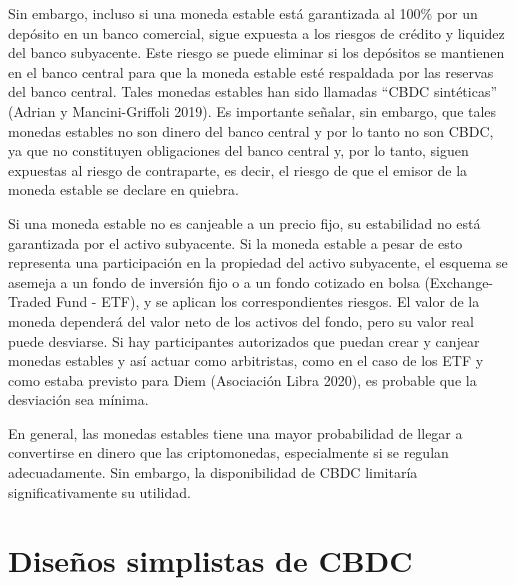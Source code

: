 \documentclass[10pt,spanish]{article}
\begin{document}
Sin embargo, incluso si una moneda estable está garantizada al 100\% por
un depósito en un banco comercial, sigue expuesta a los riesgos de
crédito y liquidez del banco subyacente. Este riesgo se puede eliminar
si los depósitos se mantienen en el banco central para que la moneda
estable esté respaldada por las reservas del banco central. Tales
monedas estables han sido llamadas ``CBDC sintéticas'' (Adrian y
Mancini-Griffoli 2019). Es importante señalar, sin embargo, que tales
monedas estables no son dinero del banco central y por lo tanto no son
CBDC, ya que no constituyen obligaciones del banco central y, por lo
tanto, siguen expuestas al riesgo de contraparte, es decir, el riesgo de
que el emisor de la moneda estable se declare en quiebra.

Si una moneda estable no es canjeable a un precio fijo, su estabilidad
no está garantizada por el activo subyacente. Si la moneda estable a
pesar de esto representa una participación en la propiedad del activo
subyacente, el esquema se asemeja a un fondo de inversión fijo o a un
fondo cotizado en bolsa (Exchange-Traded Fund - ETF), y se aplican los
correspondientes riesgos. El valor de la moneda dependerá del valor neto
de los activos del fondo, pero su valor real puede desviarse. Si hay
participantes autorizados que puedan crear y canjear monedas estables y
así actuar como arbitristas, como en el caso de los ETF y como estaba
previsto para Diem (Asociación Libra 2020), es probable que la
desviación sea mínima.

En general, las monedas estables tiene una mayor probabilidad de llegar
a convertirse en dinero que las criptomonedas, especialmente si se
regulan adecuadamente. Sin embargo, la disponibilidad de CBDC limitaría
significativamente su utilidad.

\hypertarget{diseuxf1os-simplistas-de-cbdc}{%
\section{Diseños simplistas de CBDC} \label{3.-diseuxf1os-simplistas-de-cbdc}}
\end{document}
